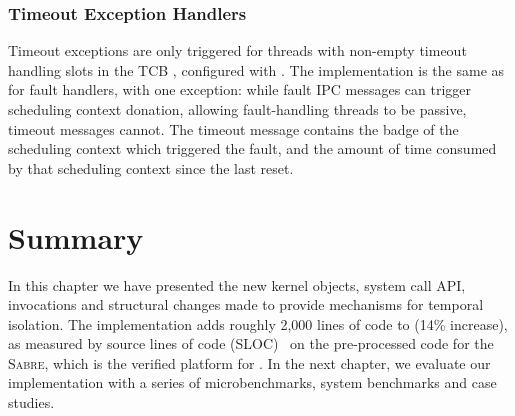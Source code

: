 \subsubsection{Timeout Exception Handlers}

Timeout exceptions are only triggered for threads with non-empty timeout handling slots in the
\gls{TCB} \cnode, configured with \tcbsettimeoutep. The implementation is the same as for
fault handlers, with one exception: while fault \gls{IPC} messages can trigger scheduling context
donation, allowing fault-handling threads to be passive, timeout messages cannot. The timeout
message contains the badge of the scheduling context which triggered the fault, and the amount of
time consumed by that scheduling context since the last reset.

\section{Summary}

In this chapter we have presented the new kernel objects, system call API, invocations and 
structural changes made to provide mechanisms for temporal isolation. 
The implementation adds roughly 2,000 lines of code to \selfour (14\% increase), as measured
by source lines of code (SLOC)~\citep{Wheeler_01} on the pre-processed code for the \textsc{Sabre},
which is the verified platform for \selfour.
In the next chapter, we evaluate our implementation with a series of microbenchmarks, 
system benchmarks and case studies.


